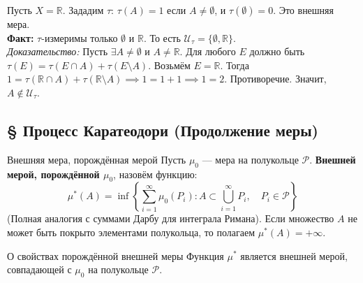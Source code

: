 \documentclass[12pt,a4paper]{article}
\begin{document}
\begin{Example}
Пусть $X = \mathbb{R}$. Зададим $\tau$: $\tau(A) = 1$ если $A \neq \emptyset$, и $\tau(\emptyset) = 0$. Это внешняя мера. \\
\textbf{Факт:} $\tau$-измеримы только $\emptyset$ и $\mathbb{R}$. То есть $\mathcal{U}_\tau = \{\emptyset, \mathbb{R}\}$. \\
\textit{Доказательство:} Пусть $\exists A \neq \emptyset$ и $A \neq \mathbb{R}$. Для любого $E$ должно быть $\tau(E) = \tau(E \cap A) + \tau(E \setminus A)$. Возьмём $E = \mathbb{R}$.
Тогда $1 = \tau(\mathbb{R} \cap A) + \tau(\mathbb{R} \setminus A) \implies 1 = 1 + 1 \implies 1 = 2$. Противоречие. Значит, $A \notin \mathcal{U}_\tau$.
\end{Example}

\subsection{§ Процесс Каратеодори (Продолжение меры)}

\begin{Definition}{Внешняя мера, порождённая мерой}{}
Пусть $\mu_0$ — мера на полукольце $\mathcal{P}$. \textbf{Внешней мерой, порождённой $\mu_0$}, назовём функцию:
$$ \mu^*(A) = \inf \left\{ \sum\limits_{i=1}^{\infty} \mu_0(P_i) : A \subset \bigcup\limits_{i=1}^{\infty} P_i, \quad P_i \in \mathcal{P} \right\} $$
(Полная аналогия с суммами Дарбу для интеграла Римана). Если множество $A$ не может быть покрыто элементами полукольца, то полагаем $\mu^*(A) = +\infty$.
\end{Definition}

\begin{Theorem}{О свойствах порождённой внешней меры}{}
Функция $\mu^*$ является внешней мерой, совпадающей с $\mu_0$ на полукольце $\mathcal{P}$.
\end{Theorem}
\end{document}
